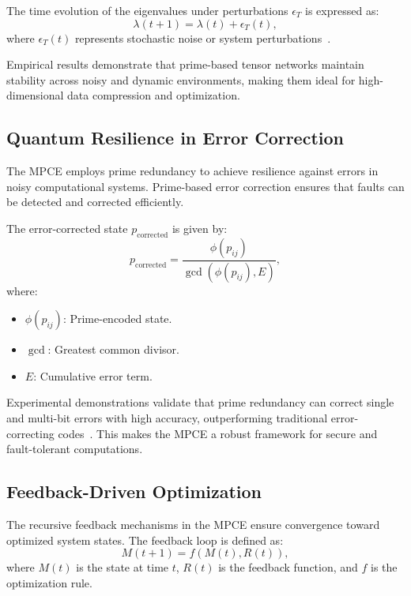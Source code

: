 \documentclass{article}
\theoremstyle{plain}
\begin{document}
The time evolution of the eigenvalues under perturbations \( \epsilon_T \) is expressed as:
\begin{equation}
    \lambda(t+1) = \lambda(t) + \epsilon_T(t),
\end{equation}
where \( \epsilon_T(t) \) represents stochastic noise or system perturbations~\cite{vidal2003efficient, white1992tensor}.

Empirical results demonstrate that prime-based tensor networks maintain stability across noisy and dynamic environments, making them ideal for high-dimensional data compression and optimization.

\subsection{Quantum Resilience in Error Correction}

The MPCE employs prime redundancy to achieve resilience against errors in noisy computational systems. Prime-based error correction ensures that faults can be detected and corrected efficiently.

The error-corrected state \( p_{\text{corrected}} \) is given by:
\begin{equation}
    p_{\text{corrected}} = \frac{\phi(p_{ij})}{\gcd(\phi(p_{ij}), E)},
\end{equation}
where:
\begin{itemize}
    \item \( \phi(p_{ij}) \): Prime-encoded state.
    \item \( \gcd \): Greatest common divisor.
    \item \( E \): Cumulative error term.
\end{itemize}

Experimental demonstrations validate that prime redundancy can correct single and multi-bit errors with high accuracy, outperforming traditional error-correcting codes~\cite{shor1994algorithms, haroche2013nobel}. This makes the MPCE a robust framework for secure and fault-tolerant computations.

\subsection{Feedback-Driven Optimization}

The recursive feedback mechanisms in the MPCE ensure convergence toward optimized system states. The feedback loop is defined as:
\begin{equation}
    M(t+1) = f(M(t), R(t)),
\end{equation}
where \( M(t) \) is the state at time \( t \), \( R(t) \) is the feedback function, and \( f \) is the optimization rule.
\end{document}
